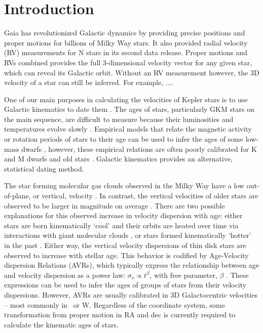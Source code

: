 \section{Introduction}

Gaia has revolutionized Galactic dynamics by providing precise positions and
proper motions for billions of Milky Way stars.
It also provided radial velocity (RV) measurements for N stars in its second
data release.
Proper motions and RVs combined provides the full 3-dimensional velocity
vector for any given star, which can reveal its Galactic orbit.
Without an RV measurement however, the 3D velocity of a star can still be
inferred.
For example, ....

One of our main purposes in calculating the velocities of Kepler stars is to
use Galactic kinematics to date them \citep[\eg][]{angus2020, lu2021}.
The ages of stars, particularly GKM stars on the main sequence, are difficult
to measure because their luminosities and temperatures evolve slowly
\citep[see][for a review of stellar ages]{soderblom2010}.
Empirical models that relate the magnetic activity or rotation periods of
stars to their age can be used to infer the ages of some low-mass dwarfs
\citep{citations}, however, these empirical relations are often poorly
calibrated for K and M dwarfs and old stars \citep{citations}.
Galactic kinematics provides an alternative, statistical dating method.

The star forming molecular gas clouds observed in the Milky Way have a low
out-of-plane, or vertical, velocity \citep[\eg][]{stark1989, stark2005,
aumer2009, martig2014, aumer2016}.
In contrast, the vertical velocities of older stars are observed to be larger
in magnitude on average \citep{stromberg1946, wielen1977, nordstrom2004,
holmberg2007, holmberg2009, aumer2009, casagrande2011, ting2019, yu2018}.
There are two possible explanations for this observed increase in velocity
dispersion with age: either stars are born kinematically `cool' and their
orbits are heated over time via interactions with giant molecular clouds
\citep[see][for a review of secular evolution in the MW]{sellwood2014}, or
stars formed kinematically `hotter' in the past \citep[\eg][]{bird2013}.
Either way, the vertical velocity dispersions of thin disk stars are observed
to increase with stellar age.
This behavior is codified by Age-Velocity dispersion Relations (AVRs), which
typically express the relationship between age and velocity dispersion as a
power law: $\sigma_v \propto t^\beta$, with free parameter, $\beta$
\citep[\eg][]{holmberg2009, yu2018}.
These expressions can be used to infer the ages of groups of stars from their
velocity dispersions.
However, AVRs are usually calibrated in 3D Galactocentric velocities -- most
commonly in \vz\ or W.
Regardless of the coordinate system, some transformation from proper motion in
RA and dec is currently required to calculate the kinematic ages of stars.

